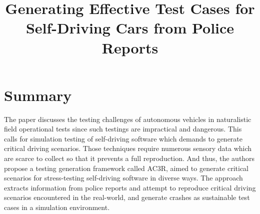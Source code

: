 \documentclass[10pt,a4paper]{report}
\title{Generating Effective Test Cases for Self-Driving Cars from Police Reports}
\begin{document}
\begin{center}
\textbf{\thetitle}
\end{center}


\section{Summary}
The paper discusses the testing challenges of autonomous vehicles in naturalistic field operational tests since such testings are impractical and dangerous. 
%
This calls for simulation testing of self-driving software which demands to generate critical driving scenarios. 
%
Those techniques require numerous sensory data which are scarce to collect so that it prevents a full reproduction.
%
And thus, the authors propose a testing generation framework called AC3R, aimed to generate critical scenarios for stress-testing self-driving software in diverse ways.
%
The approach extracts information from police reports and attempt to reproduce critical driving scenarios encountered in the real-world, and generate crashes as sustainable test cases in a simulation environment.
%
\end{document}
